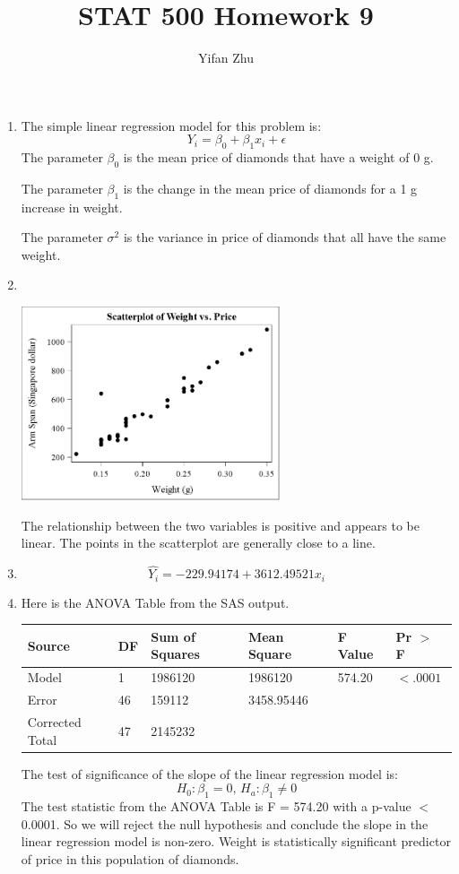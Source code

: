\documentclass{article}
\begin{document}
	

	
	\title{STAT 500 Homework 9}
	\author{Yifan Zhu}
	\maketitle
	
	\begin{enumerate}[leftmargin = 0 em, label = \arabic*., font = \bfseries]
	\item

		The simple linear regression model for this problem is:
		\[Y_i = \beta_0 + \beta_1 x_i + \epsilon\]
		The parameter $\beta_0$ is the mean price of diamonds that have
a weight of 0 g.

The parameter $\beta_1$ is the change in the mean price of diamonds for a 1 g increase in weight.

The parameter $\sigma^2$ is the variance in price of diamonds that
all have the same weight.

\item \

\begin{center}
	\includegraphics[width = 0.6\textwidth]{scatter.png}
\end{center}
The relationship between the two variables is positive and appears to be linear. The points
in the scatterplot are generally close to a line.


\item 
\[\hat{Y_i}  = -229.94174 + 3612.49521 x_i\]


\item Here is the ANOVA Table from the SAS output.

\begin{center}
	\begin{tabular}{llllll}
\toprule
Source&DF&Sum of Squares&Mean Square&F Value&Pr $>$ F\\
\midrule
Model&1&1986120&1986120&574.20&$<.0001$\\
Error&46&159112&3458.95446&&\\
Corrected Total&47&2145232&&&\\
\bottomrule
\end{tabular}
\end{center}
The test of significance of the slope of the linear regression model is:
\[H_0 : \beta_1 = 0,\, H_a : \beta_1 \neq 0\]
The test statistic from the ANOVA Table is F = 574.20 with a p-value $<$ 0.0001. So we
will reject the null hypothesis and conclude the slope in the linear regression model is
non-zero. Weight is statistically significant predictor of price in this population of
diamonds.


\end{enumerate}
\end{document}
